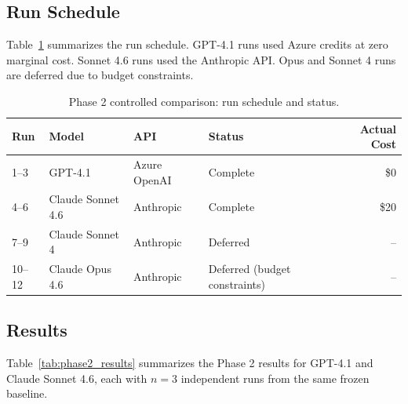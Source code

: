\documentclass[11pt]{article}
\begin{document}
\subsection{Run Schedule}
\label{sec:phase2_schedule}

Table~\ref{tab:phase2_runs} summarizes the run schedule. GPT-4.1 runs used Azure credits at zero marginal cost. Sonnet 4.6 runs used the Anthropic API. Opus and Sonnet 4 runs are deferred due to budget constraints.

\begin{table}[H]
\centering
\caption{Phase 2 controlled comparison: run schedule and status.}
\label{tab:phase2_runs}
\begin{tabular}{llllr}
\toprule
\textbf{Run} & \textbf{Model} & \textbf{API} & \textbf{Status} & \textbf{Actual Cost} \\
\midrule
1--3  & GPT-4.1           & Azure OpenAI & Complete & \$0 \\
4--6  & Claude Sonnet 4.6 & Anthropic    & Complete & \$20 \\
7--9  & Claude Sonnet 4   & Anthropic    & Deferred & -- \\
10--12 & Claude Opus 4.6  & Anthropic    & Deferred (budget constraints) & -- \\
\bottomrule
\end{tabular}
\end{table}

\subsection{Results}
\label{sec:phase2_results}

Table~\ref{tab:phase2_results} summarizes the Phase 2 results for GPT-4.1 and Claude Sonnet 4.6, each with $n=3$ independent runs from the same frozen baseline.
\end{document}
